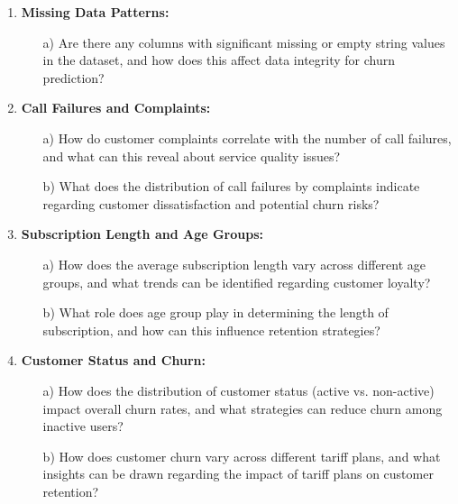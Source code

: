 \documentclass[12pt]{article}
\begin{document}
\begin{enumerate}
    \item \textbf{Missing Data Patterns:}
    
    \begin{enumerate}
        \item[a)] Are there any columns with significant missing or empty string values in the dataset, and how does this affect data integrity for churn prediction?
    \end{enumerate}

    \item \textbf{Call Failures and Complaints:}
    
    \begin{enumerate}
        \item[a)] How do customer complaints correlate with the number of call failures, and what can this reveal about service quality issues?

        \item[b)] What does the distribution of call failures by complaints indicate regarding customer dissatisfaction and potential churn risks?
    \end{enumerate}

    \item \textbf{Subscription Length and Age Groups:}
    
    \begin{enumerate}
        \item[a)] How does the average subscription length vary across different age groups, and what trends can be identified regarding customer loyalty?

        \item[b)] What role does age group play in determining the length of subscription, and how can this influence retention strategies?
    \end{enumerate}

    \item \textbf{Customer Status and Churn:}
    
    \begin{enumerate}
        \item[a)] How does the distribution of customer status (active vs. non-active) impact overall churn rates, and what strategies can reduce churn among inactive users?

        \item[b)] How does customer churn vary across different tariff plans, and what insights can be drawn regarding the impact of tariff plans on customer retention?
    \end{enumerate}



\end{enumerate}
\end{document}
